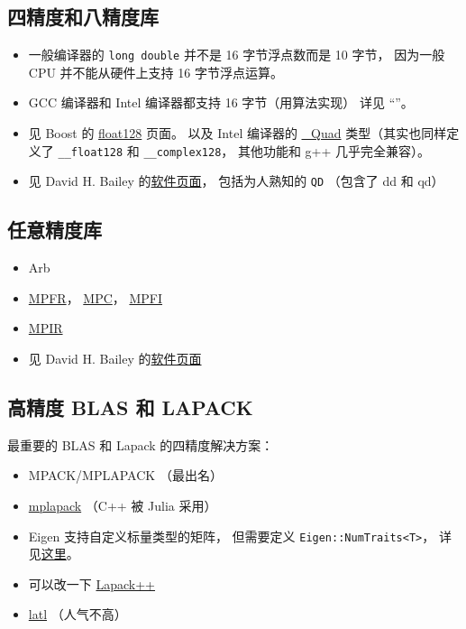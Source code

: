 
\begin{issues}
\issueDraft
\end{issues}

\subsection{四精度和八精度库}
\begin{itemize}
\item 一般编译器的 \verb|long double| 并不是 16 字节浮点数而是 10 字节， 因为一般 CPU 并不能从硬件上支持 16 字节浮点运算。
\item GCC 编译器和 Intel 编译器都支持 16 字节（用算法实现） 详见 “”。
\item 见 Boost 的 \href{https://www.boost.org/doc/libs/develop/libs/multiprecision/doc/html/boost_multiprecision/tut/floats/float128.html}{float128} 页面。 以及 Intel 编译器的 \href{https://community.intel.com/t5/Intel-C-Compiler/Quad-precision-Quad-data-type/td-p/1218636}{\_Quad} 类型（其实也同样定义了 \verb|__float128| 和 \verb|__complex128|， 其他功能和 g++ 几乎完全兼容）。
\item 见 David H. Bailey 的\href{https://www.davidhbailey.com/dhbsoftware/}{软件页面}， 包括为人熟知的 \verb|QD| （包含了 dd 和 qd）
\end{itemize}

\subsection{任意精度库}
\begin{itemize}
\item Arb
\item \href{https://www.mpfr.org/}{MPFR}， \href{https://www.multiprecision.org/mpc/}{MPC}， \href{http://perso.ens-lyon.fr/nathalie.revol/software.html}{MPFI}
\item \href{https://mpir.org/downloads.html}{MPIR}
\item 见 David H. Bailey 的\href{https://www.davidhbailey.com/dhbsoftware/}{软件页面}
\end{itemize}


\subsection{高精度 BLAS 和 LAPACK}
最重要的 BLAS 和 Lapack 的四精度解决方案：
\begin{itemize}
\item MPACK/MPLAPACK （最出名）
\item \href{https://github.com/nakatamaho/mplapack}{mplapack} （C++ 被 Julia 采用）
\item Eigen 支持自定义标量类型的矩阵， 但需要定义 \verb|Eigen::NumTraits<T>|， 详见\href{https://eigen.tuxfamily.org/dox/TopicCustomizing_CustomScalar.html}{这里}。
\item 可以改一下 \href{https://lapackpp.sourceforge.net/html/index.html}{Lapack++}
\item \href{https://github.com/langou/latl}{latl} （人气不高）
\end{itemize}
